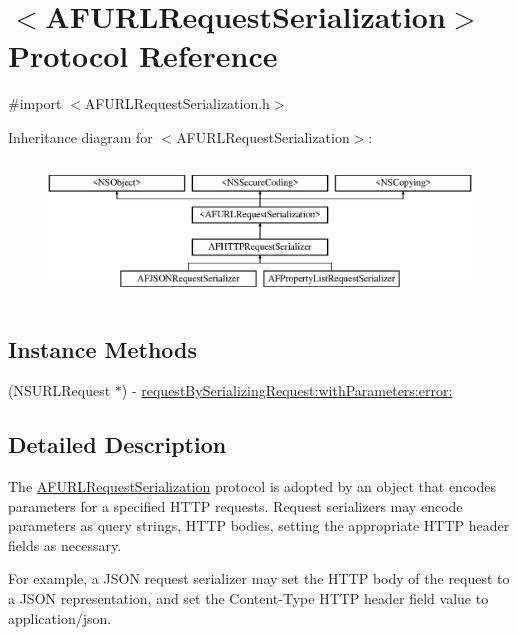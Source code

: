 \hypertarget{protocol_a_f_u_r_l_request_serialization-p}{}\section{$<$A\+F\+U\+R\+L\+Request\+Serialization$>$ Protocol Reference}
\label{protocol_a_f_u_r_l_request_serialization-p}


{\ttfamily \#import $<$A\+F\+U\+R\+L\+Request\+Serialization.\+h$>$}

Inheritance diagram for $<$A\+F\+U\+R\+L\+Request\+Serialization$>$\+:\begin{figure}[H]
\begin{center}
\leavevmode
\includegraphics[height=3.678161cm]{protocol_a_f_u_r_l_request_serialization-p}
\end{center}
\end{figure}
\subsection*{Instance Methods}
\begin{DoxyCompactItemize}
\item 
(N\+S\+U\+R\+L\+Request $\ast$) -\/ \hyperlink{protocol_a_f_u_r_l_request_serialization-p_a582252428e18798af17559ce339ef820}{request\+By\+Serializing\+Request\+:with\+Parameters\+:error\+:}
\end{DoxyCompactItemize}


\subsection{Detailed Description}
The {\ttfamily \hyperlink{protocol_a_f_u_r_l_request_serialization-p}{A\+F\+U\+R\+L\+Request\+Serialization}} protocol is adopted by an object that encodes parameters for a specified H\+T\+T\+P requests. Request serializers may encode parameters as query strings, H\+T\+T\+P bodies, setting the appropriate H\+T\+T\+P header fields as necessary.

For example, a J\+S\+O\+N request serializer may set the H\+T\+T\+P body of the request to a J\+S\+O\+N representation, and set the {\ttfamily Content-\/\+Type} H\+T\+T\+P header field value to {\ttfamily application/json}. 

